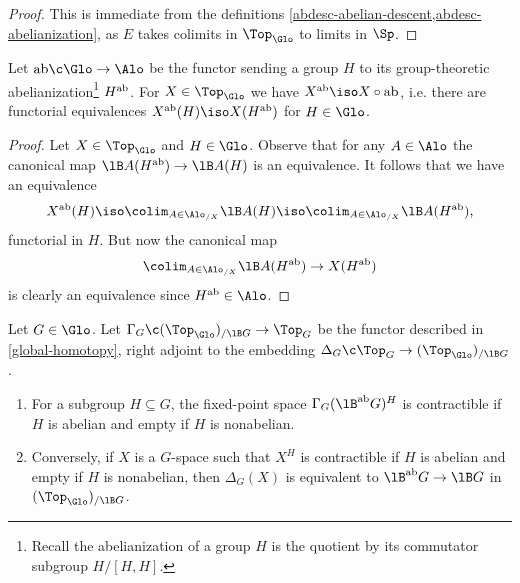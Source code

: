 \begin{proof}
  This is immediate from the definitions
  \cref{abdesc-abelian-descent,abdesc-abelianization}, as $E$ takes
  colimits in $\Top_\Glo$ to limits in $\Sp$.
\end{proof}

\begin{lemma}
  \label{abdesc-abelianization-alternate}
  Let $\ab \c \Glo \to \Alo$ be the functor sending a group $H$ to
  its group-theoretic abelianization\footnote{Recall the
    abelianization of a group $H$ is the quotient by its commutator
    subgroup $H/[H,H]$.}  $H^{\mathrm{ab}}$. For $X \in \Top_\Glo$ we have
  $X^\ab \iso X \circ \ab$, i.e. there are functorial equivalences
  $X^\ab(H) \iso X(H^\ab)$ for $H \in \Glo$.
\end{lemma}

\begin{proof}
  Let $X \in \Top_\Glo$ and $H \in \Glo$. Observe that for any
  $A \in \Alo$ the canonical map $\lB A(H^\ab) \to \lB A(H)$ is an
  equivalence. It follows that we have an equivalence
  \[
  X^\ab(H) \iso
  \colim_{A \in \Alo_{/X}} \lB A(H) \iso
  \colim_{A \in \Alo_{/X}} \lB A(H^\ab),
  \]
  functorial in $H$. But now the canonical map
  \[
  \colim_{A \in \Alo_{/X}} \lB A(H^\ab) \to X(H^\ab)
  \]
  is clearly an equivalence since $H^\ab \in \Alo$.
\end{proof}

\begin{lemma}
  \label{abdesc-abelianization-as-Gspace}
  Let $G \in \Glo$. Let $\Gamma_G \c (\Top_\Glo)_{/\lB G} \to \Top_G$
  be the functor described in \cref{global-homotopy}, right adjoint to
  the embedding $\Delta_G \c \Top_G \to (\Top_\Glo)_{/\lB G}$.
  \begin{enumerate}
  \item \label{abdesc-abelianization-gamma} For a subgroup
    $H \subseteq G$, the fixed-point space $\Gamma_G(\lB^\ab G)^H$ is
    contractible if $H$ is abelian and empty if $H$ is nonabelian.
  \item \label{abdesc-abelianization-delta} Conversely, if $X$ is a
    $G$-space such that $X^H$ is contractible if $H$ is abelian and
    empty if $H$ is nonabelian, then $\Delta_G(X)$ is equivalent to
    $\lB^\ab G \to \lB G$ in $(\Top_\Glo)_{/\lB G}$.
  \end{enumerate}
\end{lemma}

